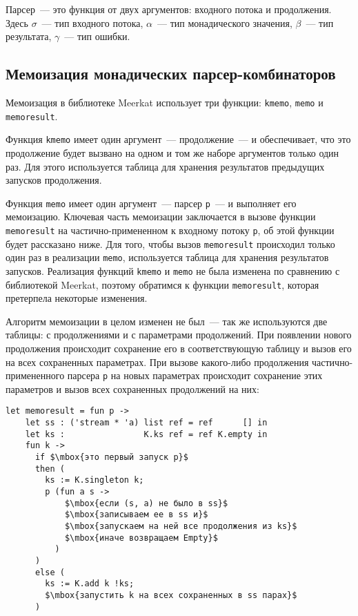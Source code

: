 \documentclass[conference]{IEEEtran}
\begin{document}
Парсер~--- это функция от двух аргументов: входного потока и продолжения. Здесь $\sigma$~--- тип входного потока, $\alpha$~--- тип монадического значения, $\beta$~--- тип результата, $\gamma$~---
тип ошибки.

\subsection{Мемоизация монадических парсер-комбинаторов}

Мемоизация в библиотеке Meerkat использует три функции: \lstinline|kmemo|, \lstinline|memo| и \lstinline|memoresult|.

Функция \lstinline|kmemo| имеет один аргумент~--- продолжение~--- и обеспечивает, что это продолжение будет вызвано на одном и том же наборе аргументов только один раз. Для этого используется
таблица для хранения результатов предыдущих запусков продолжения.

Функция \lstinline|memo| имеет один аргумент~--- парсер \lstinline|p|~--- и выполняет его мемоизацию. Ключевая часть мемоизации заключается в вызове функции \lstinline|memoresult| на
частично-примененном к входному потоку \lstinline|p|, об этой функции будет рассказано ниже. Для того, чтобы вызов \lstinline|memoresult| происходил только один раз в
реализации \lstinline|memo|, используется таблица для хранения результатов запусков. Реализация функций \lstinline|kmemo| и \lstinline|memo| не была изменена по сравнению с
библиотекой Meerkat, поэтому обратимся к функции \lstinline|memoresult|, которая претерпела некоторые изменения.

Алгоритм мемоизации в целом изменен не был~--- так же используются две таблицы: с продолжениями и с параметрами продолжений. При появлении нового продолжения происходит сохранение
его в соответствующую таблицу и вызов его на всех сохраненных параметрах. При вызове какого-либо продолжения частично-примененного парсера \lstinline|p| на новых параметрах происходит сохранение этих
параметров и вызов всех сохраненных продолжений на них:

\begin{lstlisting}[basicstyle=\small]
  let memoresult = fun p ->
    let ss : ('stream * 'a) list ref = ref      [] in
    let ks :                K.ks ref = ref K.empty in
    fun k ->
      if $\mbox{это первый запуск p}$
      then (
        ks := K.singleton k;
        p (fun a s ->
            $\mbox{если (s, a) не было в ss}$
            $\mbox{записываем ее в ss и}$
            $\mbox{запускаем на ней все продолжения из ks}$
            $\mbox{иначе возвращаем Empty}$
          )
      )
      else (
        ks := K.add k !ks;
        $\mbox{запустить k на всех сохраненных в ss парах}$
      )
\end{lstlisting}
\end{document}

